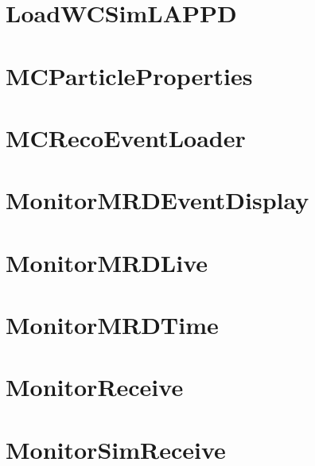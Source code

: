 \documentclass[twoside]{book}
\begin{document}
\chapter{Load\-W\-C\-Sim\-L\-A\-P\-P\-D}
\label{md_UserTools_LoadWCSimLAPPD_README}
\hypertarget{md_UserTools_LoadWCSimLAPPD_README}{}

\chapter{M\-C\-Particle\-Properties}
\label{md_UserTools_MCParticleProperties_README}
\hypertarget{md_UserTools_MCParticleProperties_README}{}

\chapter{M\-C\-Reco\-Event\-Loader}
\label{md_UserTools_MCRecoEventLoader_README}
\hypertarget{md_UserTools_MCRecoEventLoader_README}{}

\chapter{Monitor\-M\-R\-D\-Event\-Display}
\label{md_UserTools_MonitorMRDEventDisplay_README}
\hypertarget{md_UserTools_MonitorMRDEventDisplay_README}{}

\chapter{Monitor\-M\-R\-D\-Live}
\label{md_UserTools_MonitorMRDLive_README}
\hypertarget{md_UserTools_MonitorMRDLive_README}{}

\chapter{Monitor\-M\-R\-D\-Time}
\label{md_UserTools_MonitorMRDTime_README}
\hypertarget{md_UserTools_MonitorMRDTime_README}{}

\chapter{Monitor\-Receive}
\label{md_UserTools_MonitorReceive_README}
\hypertarget{md_UserTools_MonitorReceive_README}{}

\chapter{Monitor\-Sim\-Receive}
\label{md_UserTools_MonitorSimReceive_README}
\hypertarget{md_UserTools_MonitorSimReceive_README}{}

\end{document}
